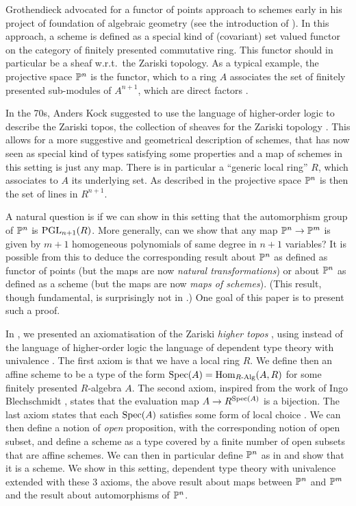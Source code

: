 Grothendieck advocated for a functor of points approach to schemes early in his
project of foundation of algebraic geometry (see the introduction of \cite{EGAI}).
In this approach, a scheme is defined as a special kind of (covariant) set valued functor
on the category of finitely presented commutative ring. This functor should in particular
be a sheaf w.r.t.\ the Zariski topology. As a typical example, the projective space $\mathbb{P}^n$
is the functor, which to a ring $A$ associates the set of finitely presented sub-modules of $A^{n+1}$, which are direct factors \cite{Demazure,Eisenbud,Jantzen}.

In the 70s, Anders Kock suggested to use the language of higher-order logic \cite{Church40}
to describe the Zariski topos, the collection of sheaves for the Zariski topology \cite{Kock74,kockreyes}.
This allows for
a more suggestive and geometrical description of schemes, that has now seen as special kind
of types satisfying some properties and a map of schemes in this setting is just any map.
There is in particular a ``generic
local ring'' $R$, which associates to $A$ its underlying set. As described in \cite{kockreyes}
the projective space $\mathbb{P}^n$ is then the set of lines in $R^{n+1}$.

A natural question is if we can show in this setting that the automorphism group of $\mathbb{P}^n$
is  $\operatorname{PGL}_{n+1}(R)$.
More generally, can we show that any map $\mathbb{P}^n\rightarrow \mathbb{P}^m$ is given by $m+1$ homogeneous
polynomials of same degree in $n+1$ variables?
It is possible from this to deduce the corresponding result about $\mathbb{P}^n$ as defined
as functor of points (but the maps are now {\em natural transformations}) or about $\mathbb{P}^n$ as
defined as a scheme (but the maps are now {\em maps of schemes}).
(This result, though fundamental, is surprisingly not in \cite{Hartshorne}.)
One goal of this paper is to present such a proof.

In \cite{draft}, we presented an axiomatisation of the Zariski {\em higher topos} \cite{lurie-htt},
using instead of the language of higher-order logic the language of dependent type theory
with univalence \cite{hott}. The first axiom is that we have a local ring $R$. We define
then an affine scheme to be a type of the form $\operatorname{Spec}(A) = \mathrm{Hom}_{R\text{-}\mathrm{Alg}}(A,R)$ for some finitely presented
$R$-algebra $A$. The second axiom, inspired from the work of Ingo Blechschmidt \cite{ingo-thesis},
states that the evaluation map $A\rightarrow R^{\operatorname{Spec}(A)}$ is a bijection. The last axiom states
that each $\operatorname{Spec}(A)$ satisfies some form of local choice \cite{draft}. We can then define a notion
of {\em open} proposition, with the corresponding notion of open subset, and define a scheme as a type
covered by a finite number of open subsets that are affine schemes. We can then in particular define
$\mathbb{P}^n$ as in \cite{kockreyes} and show that it is a scheme.
We show in this setting, dependent type theory with univalence extended with these 3 axioms,
the above result about maps between $\mathbb{P}^n$ and $\mathbb{P}^m$ and the result about automorphisms of $\mathbb{P}^n$.

